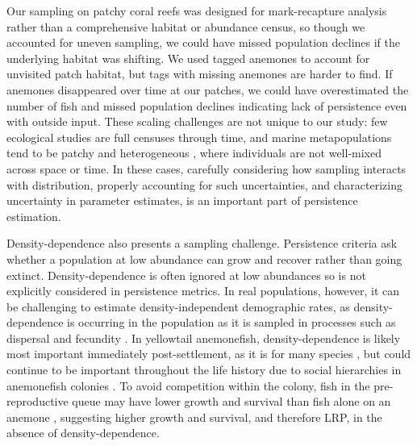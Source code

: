 \documentclass[12pt, oneside]{article}   	%
\begin{document}
Our sampling on patchy coral reefs was designed for mark-recapture analysis rather than a comprehensive habitat or abundance census, so though we accounted for uneven sampling, we could have missed population declines if the underlying habitat was shifting. We used tagged anemones to account for unvisited patch habitat, but tags with missing anemones are harder to find. If anemones disappeared over time at our patches, we could have overestimated the number of fish and missed population declines indicating lack of persistence even with outside input. These scaling challenges are not unique to our study: few ecological studies are full censuses through time, and marine metapopulations tend to be patchy and heterogeneous \citep[e.g. coral reefs, the intertidal zone, and kelp forests;][]{saenz2011connectivity, johnson2001metapopulation, castorani_connectivity_2015}, where individuals are not well-mixed across space or time. In these cases, carefully considering how sampling interacts with distribution, properly accounting for such uncertainties, and characterizing uncertainty in parameter estimates, is an important part of persistence estimation.

Density-dependence also presents a sampling challenge. Persistence criteria \citep{hastings_persistence_2006, burgess2014beyond} ask whether a population at low abundance can grow and recover rather than going extinct. Density-dependence is often ignored at low abundances \citep{botsford2019population} so is not explicitly considered in persistence metrics. In real populations, however, it can be challenging to estimate density-independent demographic rates, as density-dependence is occurring in the population as it is sampled in processes such as dispersal \citep[e.g. in butterflies,][]{nowicki2011evidence} and fecundity \citep[e.g. in warblers,][]{rodenhouse2003multiple}. In yellowtail anemonefish, density-dependence is likely most important immediately post-settlement, as it is for many species \citep[e.g. corals, trees, and butterflies;][]{vermeij2008density, harms2000pervasive, nowicki2009relative}, but could continue to be important throughout the life history due to social hierarchies in anemonefish colonies \citep[e.g.][]{buston2011determinants}. To avoid competition within the colony, fish in the pre-reproductive queue may have lower growth and survival than fish alone on an anemone \citep[seen in \textit{A. percula},][]{buston2003social, buston2003forcible}, suggesting higher growth and survival, and therefore LRP, in the absence of density-dependence.
\end{document}
